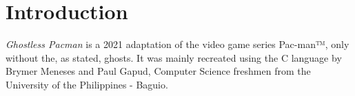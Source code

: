 
\section{Introduction}

\emph{Ghostless Pacman} is a 2021 adaptation of the video game series Pac-man™,
only without the, as stated, ghosts. It was mainly recreated using the C
language by Brymer Meneses and Paul Gapud, Computer Science freshmen
from the University of the Philippines - Baguio.

